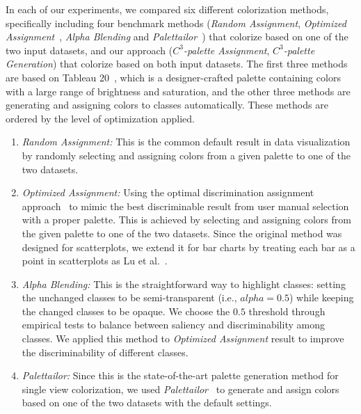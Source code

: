 \vspace{.3em}
 In each of our experiments, we compared six different colorization methods, specifically including four benchmark methods (\emph{Random Assignment}, \emph{Optimized Assignment}~\cite{Wang2018}, \emph{Alpha Blending} and \emph{Palettailor}~\cite{Lu21}) that colorize based on one of the two input datasets, and our approach (\emph{$C^3$-palette Assignment}, \emph{$C^3$-palette Generation}) that colorize based on both input datasets. The first three methods are based on Tableau 20~\cite{tableau}, which is a designer-crafted palette containing colors with a large range of brightness and saturation, and the other three methods are generating and assigning colors to classes automatically. These methods are ordered by the level of optimization applied.
\begin{enumerate}
     \item \emph{Random Assignment:} This is the common default result in data visualization by randomly selecting and assigning colors from a given palette to one of the two datasets.
     \item \emph{Optimized Assignment:} Using the optimal discrimination assignment approach~\cite{Wang2018} to mimic the best discriminable result from user manual selection with a proper palette. This is achieved by selecting and assigning colors from the given palette to one of the two datasets. Since the original method was designed for scatterplots,  we extend it for bar charts by treating each bar as a point in scatterplots as Lu et al.~\cite{Lu21}.
     \item \emph{Alpha Blending:} This is the straightforward way to highlight classes: setting the unchanged classes to be semi-transparent (i.e., $alpha=0.5$) while keeping the changed classes to be opaque. We choose the $0.5$ threshold through empirical tests to balance between saliency and discriminability among classes. We applied this method to \emph{Optimized Assignment} result to improve the discriminability of different classes.  %
     \item \emph{Palettailor:} Since this is the state-of-the-art palette generation method for single view colorization, we used \emph{Palettailor}~\cite{Lu21} to generate and assign colors based on one of the two datasets with the default settings.

\end{enumerate}
